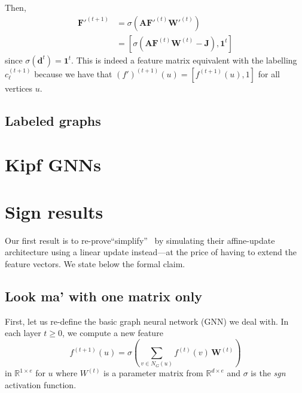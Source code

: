  
Then,
\begin{align*}
    \mathbf{F'}^{(t+1)} &=
    \sigma(
    \mathbf{A}\mathbf{F'}^{(t)}\mathbf{W'}^{(t)}
    )\\
    & =
    [\sigma(\mathbf{A}\mathbf{F}^{(t)}\mathbf{W}^{(t)}-
    \mathbf{J}),\mathbf{1}^t]
\end{align*}
since $\sigma(\mathbf{d}^t)=\mathbf{1}^t$. This is indeed a feature matrix equivalent with the labelling $c_\ell^{(t+1)}$ because we have that $(f')^{(t+1)}(u)=[f^{(t+1)}(u),1]$
for all vertices $u$.


\subsection{Labeled graphs}

\section{Kipf GNNs}



\section{Sign results}
Our first result is to re-prove``simplify''~\cite[Theorem 2]{grohewl} by simulating
their affine-update architecture using a linear update instead---at the price
of having to extend the feature vectors.  We state below the formal
claim.

\subsection{Look ma' with one matrix only}

First, let us re-define
the basic graph neural network (GNN) we deal with. In each layer $t \geq 0$, we compute a new feature
\begin{equation}\label{eqn:update-rule}
    f^{(t+1)}(u) = \sigma\left(
        \sum_{v \in N_G(u)} f^{(t)}(v)\, \mathbf{W}^{(t)}
    \right)
\end{equation}
in $\mathbb{R}^{1 \times e}$ for $u$ where $W^{(t)}$ is a
parameter matrix from $\mathbb{R}^{d \times e}$ and $\sigma$
is the \emph{sgn} activation function.

